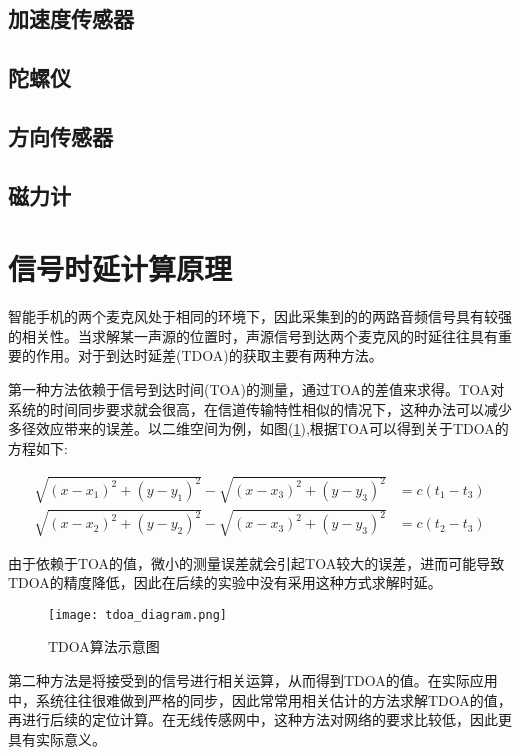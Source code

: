 \documentclass[winfonts]{njuthesis}
\begin{document}
		\subsection{加速度传感器}
			
		\subsection{陀螺仪}
		
		\subsection{方向传感器}
		
		\subsection{磁力计}
	
	\section{信号时延计算原理}
	
		智能手机的两个麦克风处于相同的环境下，因此采集到的的两路音频信号具有较强的相关性。当求解某一声源的位置时，声源信号到达两个麦克风的时延往往具有重要的作用。对于到达时延差(TDOA)的获取主要有两种方法。
		
		第一种方法依赖于信号到达时间(TOA)的测量，通过TOA的差值来求得。TOA对系统的时间同步要求就会很高，在信道传输特性相似的情况下，这种办法可以减少多径效应带来的误差。以二维空间为例，如图(\ref{fig: tdoa-diagram}),根据TOA可以得到关于TDOA的方程如下:
		
		\begin{align}
			\sqrt{(x-x_1)^2+(y-y_1)^2} - \sqrt{(x-x_3)^2+(y-y_3)^2} &= c(t_1-t_3)\\
			\sqrt{(x-x_2)^2+(y-y_2)^2} - \sqrt{(x-x_3)^2+(y-y_3)^2} &= c(t_2-t_3)
		\end{align}
		
		由于依赖于TOA的值，微小的测量误差就会引起TOA较大的误差，进而可能导致TDOA的精度降低，因此在后续的实验中没有采用这种方式求解时延。
		
		\begin{figure}[H]
			\centering
			\texttt{[image: tdoa\_diagram.png]} 
			\caption{TDOA算法示意图}
			\label{fig: tdoa-diagram}
		\end{figure}
		
		
		第二种方法是将接受到的信号进行相关运算，从而得到TDOA的值。在实际应用中，系统往往很难做到严格的同步，因此常常用相关估计的方法求解TDOA的值，再进行后续的定位计算。在无线传感网中，这种方法对网络的要求比较低，因此更具有实际意义。
		
\end{document}

